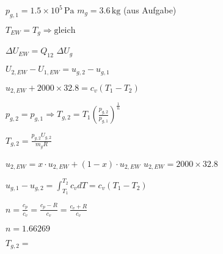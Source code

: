 \( p_{g,1} = 1.5 \times 10^5 \, \text{Pa} \)  
\( m_g = 3.6 \, \text{kg} \) (aus Aufgabe)  

\( T_{EW} = T_g \Rightarrow \text{gleich} \)  

\( \Delta U_{EW} = Q_{12} \)  
\( \Delta U_g \)  

\( U_{2,EW} - U_{1,EW} = u_{g,2} - u_{g,1} \)  

\( u_{2,EW} + 2000 \times 32.8 = c_v (T_1 - T_2) \)  

\( p_{g,2} = p_{g,1} \Rightarrow T_{g,2} = T_1 \left( \frac{p_{g,2}}{p_{g,1}} \right)^{\frac{1}{n}} \)  

\( T_{g,2} = \frac{p_{g,2} U_{g,2}}{m_g R} \)  

\( u_{2,EW} = x \cdot u_{2,EW} + (1 - x) \cdot u_{2,EW} \)  
\( u_{2,EW} = 2000 \times 32.8 \)  

\( u_{g,1} - u_{g,2} = \int_{T_1}^{T_2} c_v dT = c_v (T_1 - T_2) \)  

\( n = \frac{c_p}{c_v} = \frac{c_p - R}{c_v} = \frac{c_v + R}{c_v} \)  

\( n = 1.66269 \)  

\( T_{g,2} = \)